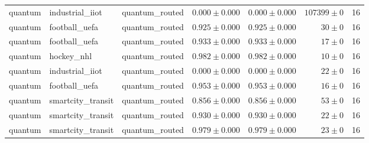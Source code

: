 \begin{table}[htbp]
\begin{tabular}{l l l r r r r}
quantum & industrial\_iiot & quantum\_routed & $0.000\pm0.000$ & $0.000\pm0.000$ & $107399\pm0$ & 16 \\
quantum & football\_uefa & quantum\_routed & $0.925\pm0.000$ & $0.925\pm0.000$ & $30\pm0$ & 16 \\
quantum & football\_uefa & quantum\_routed & $0.933\pm0.000$ & $0.933\pm0.000$ & $17\pm0$ & 16 \\
quantum & hockey\_nhl & quantum\_routed & $0.982\pm0.000$ & $0.982\pm0.000$ & $10\pm0$ & 16 \\
quantum & industrial\_iiot & quantum\_routed & $0.000\pm0.000$ & $0.000\pm0.000$ & $22\pm0$ & 16 \\
quantum & football\_uefa & quantum\_routed & $0.953\pm0.000$ & $0.953\pm0.000$ & $16\pm0$ & 16 \\
quantum & smartcity\_transit & quantum\_routed & $0.856\pm0.000$ & $0.856\pm0.000$ & $53\pm0$ & 16 \\
quantum & smartcity\_transit & quantum\_routed & $0.930\pm0.000$ & $0.930\pm0.000$ & $22\pm0$ & 16 \\
quantum & smartcity\_transit & quantum\_routed & $0.979\pm0.000$ & $0.979\pm0.000$ & $23\pm0$ & 16 \\
\hline
\end{tabular}
\end{table}
